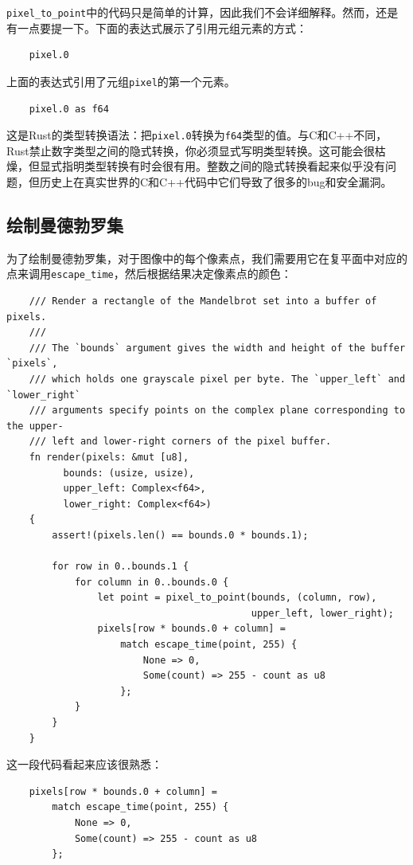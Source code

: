 \texttt{pixel\_to\_point}中的代码只是简单的计算，因此我们不会详细解释。然而，还是有一点要提一下。下面的表达式展示了引用元组元素的方式：
\begin{verbatim}
    pixel.0
\end{verbatim}
上面的表达式引用了元组\texttt{pixel}的第一个元素。

\begin{verbatim}
    pixel.0 as f64
\end{verbatim}

这是Rust的类型转换语法：把\texttt{pixel.0}转换为\texttt{f64}类型的值。与C和C++不同，Rust禁止数字类型之间的隐式转换，你必须显式写明类型转换。这可能会很枯燥，但显式指明类型转换有时会很有用。整数之间的隐式转换看起来似乎没有问题，但历史上在真实世界的C和C++代码中它们导致了很多的bug和安全漏洞。

\subsection{绘制曼德勃罗集}
为了绘制曼德勃罗集，对于图像中的每个像素点，我们需要用它在复平面中对应的点来调用\texttt{escape\_time}，然后根据结果决定像素点的颜色：
\begin{verbatim}
    /// Render a rectangle of the Mandelbrot set into a buffer of pixels.
    ///
    /// The `bounds` argument gives the width and height of the buffer `pixels`,
    /// which holds one grayscale pixel per byte. The `upper_left` and `lower_right`
    /// arguments specify points on the complex plane corresponding to the upper-
    /// left and lower-right corners of the pixel buffer.
    fn render(pixels: &mut [u8],
          bounds: (usize, usize),
          upper_left: Complex<f64>,
          lower_right: Complex<f64>)
    {
        assert!(pixels.len() == bounds.0 * bounds.1);

        for row in 0..bounds.1 {
            for column in 0..bounds.0 {
                let point = pixel_to_point(bounds, (column, row),
                                           upper_left, lower_right);
                pixels[row * bounds.0 + column] = 
                    match escape_time(point, 255) {
                        None => 0,
                        Some(count) => 255 - count as u8
                    };
            }
        }
    }
\end{verbatim}

这一段代码看起来应该很熟悉：
\begin{verbatim}
    pixels[row * bounds.0 + column] =
        match escape_time(point, 255) {
            None => 0,
            Some(count) => 255 - count as u8
        };
\end{verbatim}

